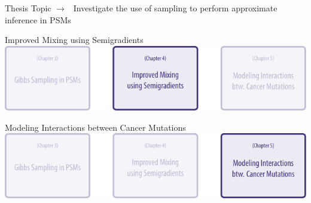 \documentclass[mathserif]{beamer}
\begin{document}
\begin{frame}{Thesis Topic}
$\rightarrow\ \ $ Investigate the use of sampling to perform approximate inference in PSMs

\vspace{4em}

\centering
{}
\end{frame}

\begin{frame}{Improved Mixing using Semigradients}
\centering
\includegraphics[width=\textwidth]{figures/chapters2.pdf}
\end{frame}

\begin{frame}{Modeling Interactions between Cancer Mutations}
\centering
\includegraphics[width=\textwidth]{figures/chapters3.pdf}
\end{frame}
\end{document}
